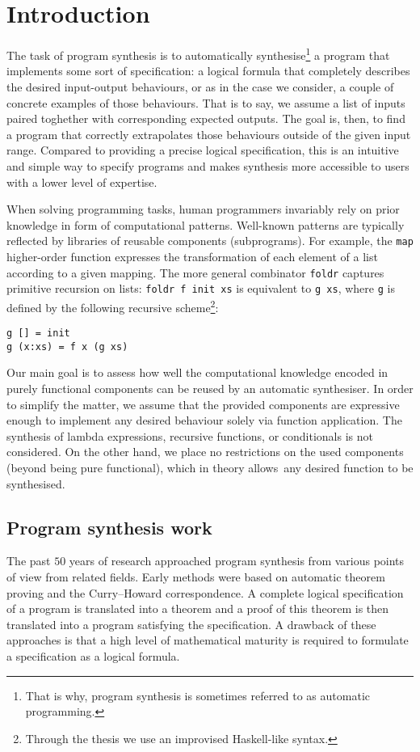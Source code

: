 \lstset{style=plain}

\chapter{Introduction}\label{ch:introduction}
The task of program synthesis is to automatically synthesise\footnote{That is why, program synthesis is sometimes referred to as automatic programming.} a program that implements some sort of specification: a logical formula that completely describes the desired input-output behaviours, or as in the case we consider, a couple of concrete examples of those behaviours.  That is to say, we assume a list of inputs paired toghether with corresponding expected outputs. The goal is, then, to find a program that correctly extrapolates those behaviours outside of the given input range.  Compared to providing a precise logical specification, this is an intuitive and simple way to specify programs and makes synthesis more accessible to users with a lower level of expertise.

When solving programming tasks, human programmers invariably rely on prior knowledge in form of computational patterns.  Well-known patterns are typically reflected by libraries of reusable components (subprograms).  For example, the \lstinline!map! higher-order function expresses the transformation of each element of a list according to a given mapping.  The more general combinator \lstinline!foldr! captures primitive recursion on lists: \lstinline!foldr f init xs! is equivalent to \lstinline!g xs!, where \lstinline!g! is defined by the following recursive scheme\footnote{Through the thesis we use an improvised Haskell-like syntax.}:
\begin{lstlisting}[style=plain]
g [] = init
g (x:xs) = f x (g xs)
\end{lstlisting}

Our main goal is to assess how well the computational knowledge encoded in purely functional components can be reused by an automatic synthesiser.  In order to simplify the matter, we assume that the provided components are expressive enough to implement any desired behaviour solely via function application.  The synthesis of lambda expressions, recursive functions, or conditionals is not considered.  On the other hand, we place no restrictions on the used components (beyond being pure functional), which in theory allows~any desired function to be synthesised.

\section{Program synthesis work}\label{Background}
The past $50$ years of research approached program synthesis from various points of view from related fields.  Early methods \cite{Manna:1980:DAP:357084.357090} were based on automatic theorem proving and the Curry–Howard correspondence.  A complete logical specification of a program is translated into a theorem and a proof of this theorem is then translated into a program satisfying the specification. A drawback of these approaches is that a high level of mathematical maturity is required to formulate a specification as a logical formula.

